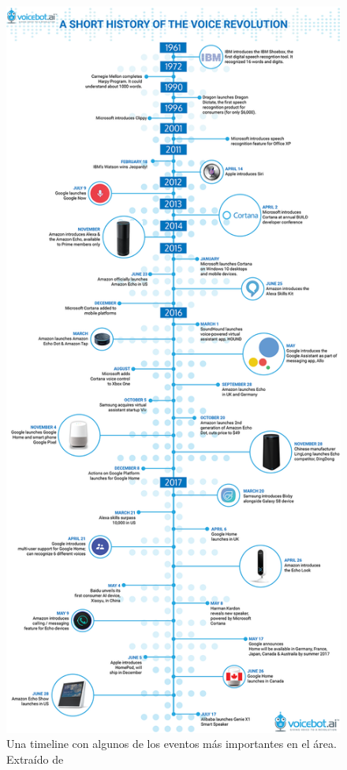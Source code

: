\begin{figure}[p]
	\centering
	\includegraphics[height=0.98\textheight]{imagenes/Timeline_VA.png}
	\caption{Una timeline con algunos de los eventos más importantes en el área. Extraído de \cite{va-history}}
\end{figure}

